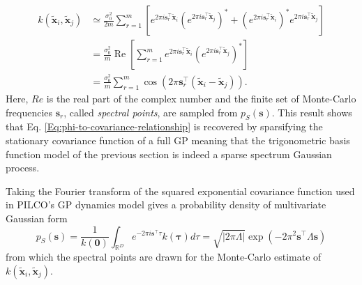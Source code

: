\begin{equation}
    \begin{aligned} 
    k\left(\tilde{\mathbf{x}}_{i}, \tilde{\mathbf{x}}_{j}\right) 
    & \simeq \frac{\sigma_{0}^{2}}{2 m} \sum_{r=1}^{m}\left[e^{2 \pi i \mathbf{s}_{r}^{\top} \tilde{\mathbf{x}}_{i}}\left(e^{2 \pi i \mathbf{s}_{r}^{\top} \tilde{\mathbf{x}}_{j}}\right)^{*}+\left(e^{2 \pi i \mathbf{s}_{r}^{\top} \tilde{\mathbf{x}}_{i}}\right)^{*} e^{2 \pi i \mathbf{s}_{r}^{\top} \tilde{\mathbf{x}}_{j}}\right] \\ &=\frac{\sigma_{0}^{2}}{m} \operatorname{Re}\left[\sum_{r=1}^{m} e^{2 \pi i \mathbf{s}_{r}^{\top} \tilde{\mathbf{x}}_{i}}\left(e^{2 \pi i \mathbf{s}_{r}^{\top} \tilde{\mathbf{x}}_{j}}\right)^{*}\right] \\
    &=\frac{\sigma_{0}^{2}}{m} \sum_{r=1}^{m} \cos \left(2 \pi \mathbf{s}_{r}^{\top}\left(\tilde{\mathbf{x}}_{i}-\tilde{\mathbf{x}}_{j}\right)\right).
    \end{aligned}
\end{equation}
Here, $Re$ is the real part of the complex number and the finite set of Monte-Carlo frequencies $\mathbf{s}_{r}$, called \textit{spectral points}, are sampled from $p_{S}(\mathbf{s})$. This result shows that Eq. \ref{Eq:phi-to-covariance-relationship} is recovered by sparsifying the stationary covariance function of a full GP meaning that the trigonometric basis function model of the previous section is indeed a sparse spectrum Gaussian process. 

Taking the Fourier transform of the squared exponential covariance function used in PILCO's GP dynamics model gives a probability density of multivariate Gaussian form
\begin{equation}
    p_{S}(\mathbf{s})=\frac{1}{k(\mathbf{0})} \int_{\mathbb{R}^{D}} e^{-2 \pi i \mathbf{s}^{\top} \tau} k(\mathbf{\tau}) d \tau=\sqrt{|2 \pi \Lambda|} \exp \left(-2 \pi^{2} \mathbf{s}^{\top} \Lambda \mathbf{s}\right)
    \label{Eq:Gaussian-spectral-points-sample}
\end{equation}
from which the spectral points are drawn for the Monte-Carlo estimate of $k(\tilde{\mathbf{x}}_{i},\tilde{\mathbf{x}}_{j})$. 

